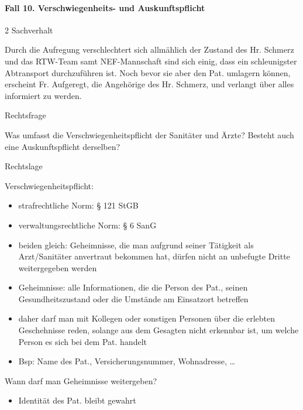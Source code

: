 \documentclass{article}
\begin{document}
\paragraph{Fall 10. Verschwiegenheits- und Auskunftspflicht}
\begin{multicols}{2}
Sachverhalt

Durch die Aufregung verschlechtert sich allm\"ahlich der Zustand des Hr.
Schmerz und das RTW-Team samt NEF-Mannschaft sind sich einig, dass ein
schleunigster Abtransport durchzuf\"uhren ist. Noch bevor sie aber den
Pat. umlagern k\"onnen, erscheint Fr. Aufgeregt, die Angeh\"orige des
Hr. Schmerz, und verlangt \"uber alles informiert zu werden.

Rechtsfrage

Was umfasst die Verschwiegenheitspflicht der Sanit\"ater und \"Arzte?
Besteht auch eine Auskunftspflicht derselben?

Rechtslage

Verschwiegenheitspflicht:

\begin{itemize}
\item strafrechtliche Norm: {\S} 121 StGB

\item verwaltungsrechtliche Norm: {\S} 6 SanG

\item beiden gleich: Geheimnisse, die man aufgrund seiner T\"atigkeit
als Arzt/Sanit\"ater anvertraut bekommen hat, d\"urfen nicht an
unbefugte Dritte weitergegeben werden

\end{itemize}
\begin{itemize}
\item Geheimnisse: alle Informationen, die die Person des Pat., seinen
Gesundheitszustand oder die Umst\"ande am Einsatzort betreffen

\item daher darf man mit Kollegen oder sonstigen Personen \"uber die
erlebten Geschehnisse reden, solange aus dem Gesagten nicht erkennbar
ist, um welche Person es sich bei dem Pat. handelt 

\item Bsp: Name des Pat., Versicherungsnummer, Wohnadresse, {\dots}

\end{itemize}
Wann darf man Geheimnisse weitergeben?

\begin{itemize}
\item Identit\"at des Pat. bleibt gewahrt


\end{itemize}
\end{multicols}
\end{document}
